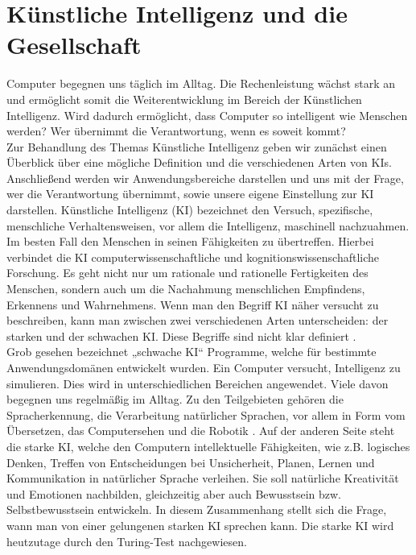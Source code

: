 \section{Künstliche Intelligenz und die Gesellschaft}

Computer begegnen uns täglich im Alltag. Die Rechenleistung wächst stark an und ermöglicht somit die Weiterentwicklung im Bereich der Künstlichen Intelligenz. Wird dadurch ermöglicht, dass Computer so intelligent wie Menschen werden? Wer übernimmt die Verantwortung, wenn es soweit kommt?\\
%

Zur Behandlung des Themas Künstliche Intelligenz geben wir zunächst einen Überblick über eine mögliche Definition und die verschiedenen Arten von KIs.
Anschließend werden wir Anwendungsbereiche darstellen und uns mit der Frage, wer die Verantwortung übernimmt, sowie unsere eigene Einstellung zur KI darstellen.
Künstliche Intelligenz (KI) bezeichnet den Versuch, spezifische, menschliche Verhaltensweisen, vor allem die Intelligenz, maschinell nachzuahmen. Im besten Fall den Menschen in seinen Fähigkeiten zu übertreffen. Hierbei verbindet die KI computerwissenschaftliche und kognitionswissenschaftliche Forschung.
Es geht nicht nur um rationale und rationelle Fertigkeiten des Menschen, sondern auch um die Nachahmung menschlichen Empfindens, Erkennens und Wahrnehmens.
Wenn man den Begriff KI näher versucht zu beschreiben, kann man zwischen zwei verschiedenen Arten unterscheiden: der starken und der schwachen KI. Diese Begriffe sind nicht klar definiert \cite{UniversitaetOldenburg}. \\
%

Grob gesehen bezeichnet „schwache KI“ Programme, welche für bestimmte Anwendungsdomänen entwickelt wurden. Ein Computer versucht, Intelligenz zu simulieren. Dies wird in unterschiedlichen Bereichen angewendet. Viele davon begegnen uns regelmäßig im Alltag. Zu den Teilgebieten gehören die Spracherkennung, die Verarbeitung natürlicher Sprachen, vor allem in Form vom Übersetzen, das Computersehen und die Robotik \cite{UniversitaetJena} \cite{Spektrum_1}.
Auf der anderen Seite steht die starke KI, welche den Computern intellektuelle Fähigkeiten, wie z.B. logisches Denken, Treffen von Entscheidungen bei Unsicherheit, Planen, Lernen und Kommunikation in natürlicher Sprache verleihen. Sie soll natürliche Kreativität und Emotionen nachbilden, gleichzeitig aber auch Bewusstsein bzw. Selbstbewusstsein entwickeln. In diesem Zusammenhang stellt sich die Frage, wann man von einer gelungenen starken KI sprechen kann. Die starke KI wird heutzutage durch den Turing-Test nachgewiesen. \\
%

